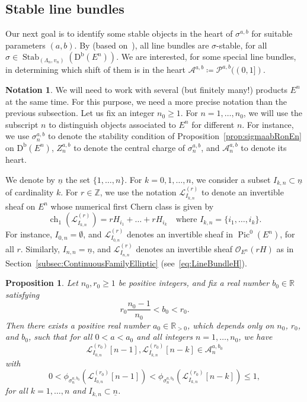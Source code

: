 \documentclass[11pt, reqno]{amsart}
\numberwithin{equation}{section}
\theoremstyle{plain}
\newtheorem{proposition}[theorem]{Proposition}
\theoremstyle{remark}
\theoremstyle{definition}
\newtheorem{notation}[theorem]{Notation}
\theoremstyle{italicsname}
\newcommand{\Db}{\mathrm{D^b}}
\DeclareMathOperator{\Stab}{Stab}
\DeclareMathOperator{\Pic}{Pic}
\DeclareMathOperator{\ch}{{ch}}
\newcommand{\cO}{\mathcal{O}}
\newcommand{\cL}{\mathcal{L}}
\newcommand{\cA}{\mathscr{A}}
\newcommand{\cP}{\mathscr{P}}
\def\RR{\ensuremath{\mathbb{R}}}
\def\ZZ{\ensuremath{\mathbb{Z}}}
\begin{document}
\subsection{Stable line bundles}\label{subsec:StableLineBundles}

Our next goal is to identify some stable objects in the heart of $\sigma^{a,b}$ for suitable parameters $(a,b)$. 
By \cite[Corollary~2.16]{FLZ:Albanese} (based on~\cite[Proposition~3.1.4]{Polishchuk:lagrangian}), all line bundles are $\sigma$-stable, for all $\sigma\in\Stab_{(\Lambda_n,v_n)}(\Db(E^n))$.
We are interested, for some special line bundles, in determining which shift of them is in the heart $\cA^{a,b}\coloneqq\cP^{a,b}((0,1])$.

\begin{notation}
We will need to work with several (but finitely many!) products $E^n$ at the same time.
For this purpose, we need a more precise notation than the previous subsection.
Let us fix an integer $n_0\geq1$.
For $n=1,\dots,n_0$,  we will use the subscript $n$ to distinguish objects associated to $E^n$ for different $n$.
For instance, we use $\sigma_n^{a,b}$ to denote the stability condition of Proposition~\ref{prop:sigmaabRonEn} on $\Db(E^n)$, $Z^{a,b}_n$ to denote the central charge of $\sigma_n^{a,b}$, and $\cA_n^{a,b}$ to denote its heart.

We denote by $\underline{n}$ the set $\{1,\dots,n\}$.
For $k=0,1,\dots,n$, we consider a subset $I_{k,n}\subset\underline{n}$ of cardinality $k$.
For $r\in\ZZ$, we use the notation $\cL_{I_{k,n}}^{(r)}$ to denote an invertible sheaf on $E^n$ whose numerical first Chern class is given by
\[
\ch_1(\cL_{I_{k,n}}^{(r)})=rH_{i_1}+\dots+rH_{i_k} \quad \text{where } I_{k,n}=\{i_1,\dots,i_k\}.
\]
For instance, $I_{0,n}=\emptyset$, and $\cL_{I_{0,n}}^{(r)}$ denotes an invertible sheaf in $\Pic^0(E^n)$, for all $r$. 
Similarly, $I_{n,n}=\underline{n}$, and $\cL_{I_{n,n}}^{(r)}$ denotes an invertible sheaf $\cO_{E^n}(rH)$ as in Section~\ref{subsec:ContinuousFamilyElliptic} (see~\eqref{eq:LineBundleH}).
\end{notation} 

\begin{proposition}\label{prop:LineBundleStability}
Let $n_0,r_0\geq1$ be positive integers, and fix a real number $b_0 \in \RR$ satisfying 
\begin{equation*}
r_0\frac{n_0-1}{n_0}<b_0<r_0. 
\end{equation*}
Then there exists a positive real number $a_0\in\RR_{>0}$, which depends only on $n_0$, $r_0$, and $b_0$, such that for all $0<a<a_0$ and all integers $n=1,\dots, n_0$, we have
\[
\cL_{I_{0,n}}^{(r_0)}[n-1],\cL_{I_{k,n}}^{(r_0)}[n-k]\in\cA_n^{a,b_0} 
\]
with
\[
0<\phi_{\sigma_n^{a,b_0}}(\cL_{I_{0,n}}^{(r_0)}[n-1])<\phi_{\sigma_n^{a,b_0}}(\cL_{I_{k,n}}^{(r_0)}[n-k])\leq 1,
\]
for all $k=1,\dots,n$ and $I_{k,n}\subset\underline{n}$.
\end{proposition}
\end{document}

